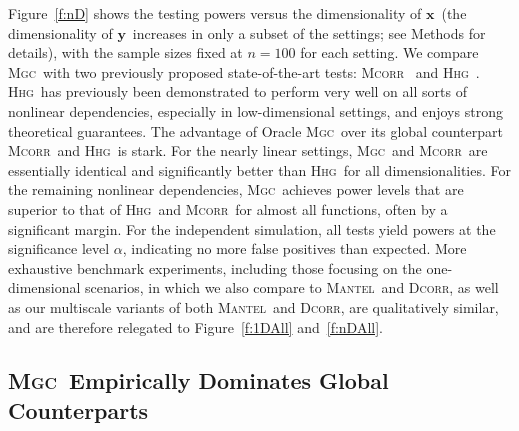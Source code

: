 \documentclass[11pt]{article}
\providecommand{\sct}[1]{{\normalfont\textsc{#1}}}
\providecommand{\mb}[1]{\boldsymbol{#1}}
\newcommand{\Mgc}{\sct{Mgc}}
\newcommand{\Hhg}{\sct{Hhg}}
\newcommand{\Dcorr}{\sct{Dcorr}}
\newcommand{\Mcorr}{\sct{Mcorr}}
\newcommand{\Mantel}{\sct{Mantel}}
\newcommand{\mbx}{\ensuremath{\mb{x}}}
\newcommand{\mby}{\ensuremath{\mb{y}}}
\begin{document}
Figure~\ref{f:nD} shows the testing powers versus the dimensionality of \mbx~(the dimensionality of \mby~increases in only a subset of the settings; see Methods for details), with the sample sizes fixed at $n=100$ for each setting.  We compare   \Mgc~with two previously proposed state-of-the-art tests: \Mcorr~\cite{SzekelyRizzo2013a} and \Hhg~\cite{HellerGorfine2013}.  \Hhg~has previously been demonstrated to perform very well on all sorts of nonlinear dependencies, especially in low-dimensional settings, and enjoys strong theoretical guarantees. 
%
The advantage of Oracle \Mgc~over its global counterpart \Mcorr~and \Hhg~is  stark. For the nearly linear settings, \Mgc~and \Mcorr~are essentially identical and significantly better than \Hhg~for all dimensionalities.  For the remaining nonlinear dependencies, \Mgc~achieves power levels that are superior to that of \Hhg~and \Mcorr~for almost all functions, often by a significant margin.  For the independent simulation, all tests yield powers at the significance level $\alpha$,  indicating no more false positives than expected.
More exhaustive benchmark experiments, including those focusing on the one-dimensional scenarios,
in which we also compare to \Mantel~and \Dcorr, 
as well as our  multiscale variants of both \Mantel~and \Dcorr, 
 are qualitatively similar, and are therefore relegated to Figure~\ref{f:1DAll} and~\ref{f:nDAll}.



\subsection*{\Mgc~Empirically Dominates Global Counterparts}
\end{document}
